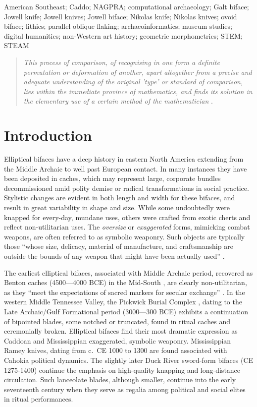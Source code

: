 \documentclass[]{interact}
\theoremstyle{plain}%
\theoremstyle{definition}
\theoremstyle{remark}
\begin{document}
\begin{keywords}
American Southeast; Caddo; NAGPRA; computational archaeology; Galt
biface; Jowell knife; Jowell knives; Jowell biface; Nikolas knife;
Nikolas knives; ovoid biface; lithics; parallel oblique flaking;
archaeoinformatics; museum studies; digital humanities; non-Western art
history; geometric morphometrics; STEM; STEAM
\end{keywords}

\begin{quote}
\textit{This process of comparison, of recognising in one form a definite permutation or deformation of another, apart altogether from a precise and adequate understanding of the original 'type' or standard of comparison, lies within the immediate province of mathematics, and finds its solution in the elementary use of a certain method of the mathematician} \citep{RN7522}.
\end{quote}

\hypertarget{introduction}{%
\section{Introduction}\label{introduction}}

Elliptical bifaces have a deep history in eastern North America
extending from the Middle Archaic to well past European contact. In many
instances they have been deposited in caches, which may represent large,
corporate bundles decommissioned amid polity demise or radical
transformations in social practice. Stylistic changes are evident in
both length and width for these bifaces, and result in great variability
in shape and size. While some undoubtedly were knapped for every-day,
mundane uses, others were crafted from exotic cherts and reflect
non-utilitarian uses. The \emph{oversize} or \emph{exaggerated} forms,
mimicking combat weapons, are often referred to as symbolic weaponry.
Such objects are typically those ``whose size, delicacy, material of
manufacture, and craftsmanship are outside the bounds of any weapon that
might have been actually used'' \citep[624]{RN11177}.

The earliest elliptical bifaces, associated with Middle Archaic period,
recovered as Benton caches (4500---4000 BCE) in the Mid-South
\citep{RN11179}, are clearly non-utilitarian, as they ``meet the
expectations of sacred markers for secular exchange''
\citep[143]{RN11178}. In the western Middle Tennessee Valley, the
Pickwick Burial Complex \citep[94]{RN11180}, dating to the Late
Archaic/Gulf Formational period (3000---300 BCE) exhibits a continuation
of bipointed blades, some notched or truncated, found in ritual caches
and ceremonially broken. Elliptical bifaces find their most dramatic
expression as Caddoan and Mississippian exaggerated, symbolic weaponry.
Mississippian Ramey knives, dating from c.~CE 1000 to 1300 are found
associated with Cahokia political dynamics. The slightly later Duck
River sword-form bifaces (CE 1275-1400) continue the emphasis on
high-quality knapping and long-distance circulation. Such lanceolate
blades, although smaller, continue into the early seventeenth century
when they serve as regalia among political and social elites in ritual
performances.
\end{document}
